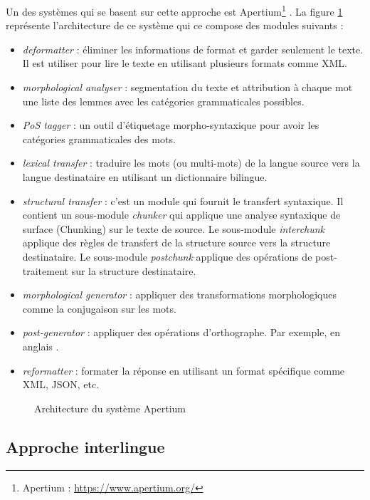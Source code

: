 \documentclass{KodeBook}
\begin{document}
Un des systèmes qui se basent sur cette approche est Apertium\footnote{Apertium : \url{https://www.apertium.org/}} \cite{11-forcada-al}.
La figure \ref{fig:apertium-arch} représente l'architecture de ce système qui ce compose des modules suivants :
\begin{itemize}
	\item \textit{deformatter} : éliminer les informations de format et garder seulement le texte. 
	Il est utiliser pour lire le texte en utilisant plusieurs formats comme XML.
	\item \textit{morphological analyser} : segmentation du texte et attribution à chaque mot une liste des lemmes avec les catégories grammaticales possibles.
	\item \textit{PoS tagger} : un outil d'étiquetage morpho-syntaxique pour avoir les catégories grammaticales des mots.
	\item \textit{lexical transfer} : traduire les mots (ou multi-mots) de la langue source vers la langue destinataire en utilisant un dictionnaire bilingue.
	\item \textit{structural transfer} : c'est un module qui fournit le transfert syntaxique. 
	Il contient un sous-module \textit{chunker} qui applique une analyse syntaxique de surface (Chunking) sur le texte de source. 
	Le sous-module \textit{interchunk} applique des règles de transfert de la structure source vers la structure destinataire. 
	Le sous-module \textit{postchunk} applique des opérations de post-traitement sur la structure destinataire.
	\item \textit{morphological generator} : appliquer des transformations morphologiques comme la conjugaison sur les mots. 
	\item \textit{post-generator} : appliquer des opérations d'orthographe. 
	Par exemple, en anglais .
	\item \textit{reformatter} : formater la réponse en utilisant un format spécifique comme XML, JSON, etc.
\end{itemize}

\begin{figure}[!ht]
	\centering
	\caption{Architecture du système Apertium \cite{11-forcada-al}}
	\label{fig:apertium-arch}
\end{figure}

\subsection{Approche interlingue}
\end{document}

